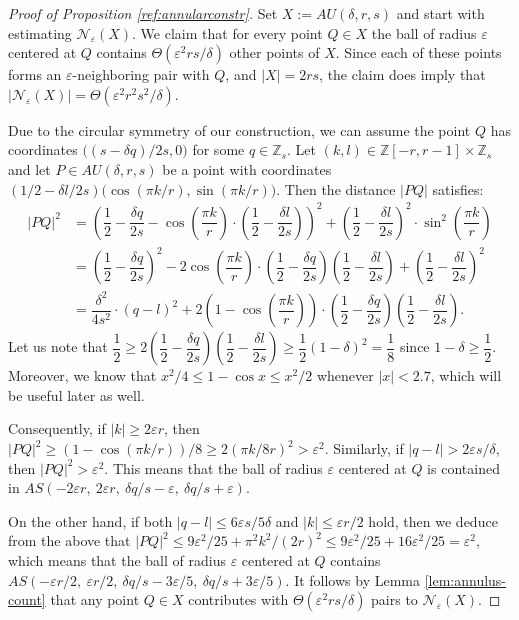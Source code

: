 \documentclass[10pt,a4paper]{amsart}
\newcommand{\eps}{\varepsilon}
\begin{document}
\begin{proof}[Proof of Proposition \ref{ref:annularconstr}]
Set $X:= AU(\delta,r,s)$ and start with estimating $\mathcal{N}_\eps(X)$. We claim that for every point $Q\in X$ the ball of radius $\eps$ centered at $Q$ contains $\Theta\left(\eps^2rs/\delta\right)$ other points of $X$. Since each of these points forms an $\eps$-neighboring pair with $Q$, and $|X|=2rs$, the claim does imply that $|\mathcal{N}_\eps(X)|=\Theta\left(\eps^2r^2s^2/\delta\right)$.

Due to the circular symmetry of our construction, we can assume the point $Q$ has coordinates $\big((s-\delta q)/2s,0\big)$ for some $q\in \mathbb{Z}_s$. Let $(k,l)\in  \mathbb{Z}[-r,r-1] \times \mathbb{Z}_s$ and let $P\in AU(\delta,r,s)$ be a point with coordinates
$(1/2-\delta l/2s)\big(\cos(\pi k/r),\sin(\pi k/r)\big)$. Then the distance $|PQ|$ satisfies: 
    \begin{align*}
        |PQ|^2 &= \left(\dfrac{1}{2}-\dfrac{\delta q}{2s}-\cos\left(\dfrac{\pi k}{r}\right)\cdot \left(\dfrac{1}{2}-\dfrac{\delta l}{2s}\right)\right)^2 +\left(\dfrac{1}{2}-\dfrac{\delta l}{2s}\right)^2\cdot \sin^2\left(\dfrac{\pi k}{r}\right) \\
         &=  \left(\dfrac{1}{2}-\dfrac{\delta q}{2s}\right)^2 - 2\cos\left(\dfrac{\pi k}{r}\right)\cdot \left(\dfrac{1}{2}-\dfrac{\delta q}{2s}\right)\left(\dfrac{1}{2}-\dfrac{\delta l}{2s}\right) + \left(\dfrac{1}{2}-\dfrac{\delta l}{2s}\right)^2\\
         &= \dfrac{\delta^2}{4s^2}\cdot (q-l)^2 + 2\left(1-\cos\left(\dfrac{\pi k}{r}\right)\right)\cdot \left(\dfrac{1}{2}-\dfrac{\delta q}{2s}\right)\left(\dfrac{1}{2}-\dfrac{\delta l}{2s}\right).
    \end{align*}
   \indent Let us note that $\dfrac{1}{2}\geq 2\left(\dfrac{1}{2}-\dfrac{\delta q}{2s}\right)\left(\dfrac{1}{2}-\dfrac{\delta l}{2s}\right)\geq\dfrac{1}{2}(1-\delta)^2=\dfrac{1}{8}$ since $1-\delta\geq \dfrac{1}{2}$. Moreover, we know that $x^2/4\leq 1-\cos x\leq x^2/2$ whenever $|x|<2.7$, which will be useful later as well. 
 
 Consequently, if $|k|\geq 2\varepsilon r$, then $|PQ|^2\geq (1-\cos(\pi k/r))/8\geq 2(\pi k/8r)^2>\varepsilon^2$. Similarly, if $|q-l|>2\varepsilon s/\delta$, then $|PQ|^2>\varepsilon^2$. This means that the ball of radius $\eps$ centered at $Q$ is contained in $AS(-2\eps r,\ 2\eps r,\ \delta q/s-\eps,\ \delta q/s +\eps)$. 
 
  On the other hand, if both $|q-l|\leq 6\eps s/5\delta$ and $|k|\leq \eps r/2$ hold, then we deduce from the above that $|PQ|^2\leq 9\eps^2/25 +\pi^2k^2/(2r)^2\leq 9\eps^2/25+16\eps^2/25=\eps^2$, which means that the ball of radius $\eps$ centered at $Q$ contains $AS(-\eps r/2,\ \eps r/2,\ \delta q/s-3\eps/5,\ \delta q/s+3\eps/5)$. It follows by Lemma \ref{lem:annulus-count} that any point $Q\in X$ contributes with $\Theta\left(\eps^2rs/\delta\right)$ pairs to $\mathcal{N}_{\eps}(X)$.


\end{proof}
\end{document}
